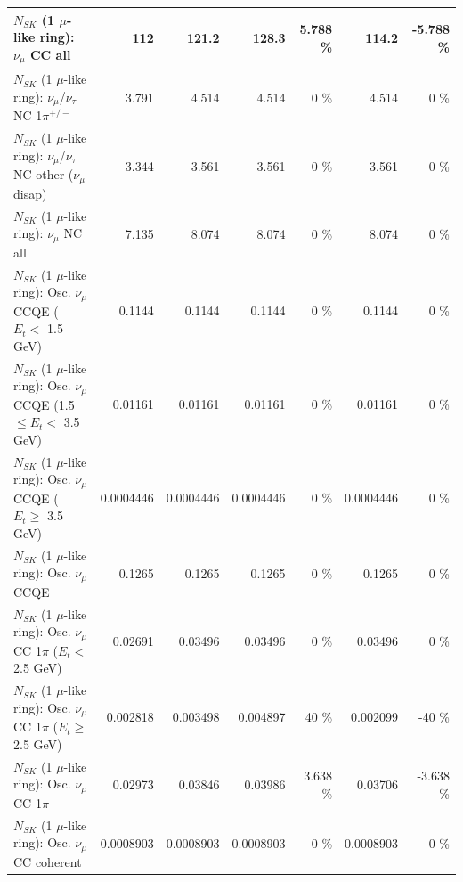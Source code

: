 \begin{table}
\begin{tabular}{| l | r | r | r  r | r  r |}
                                $N_{SK}$ (1 $\mu$-like ring): $\nu_{\mu}$ CC all &             112 &           121.2 &           128.3 &    5.788 \%  &           114.2 &   -5.788 \%  \\ 
\hline
              $N_{SK}$ (1 $\mu$-like ring): $\nu_\mu$/$\nu_\tau$ NC 1$\pi^{+/-}$ &           3.791 &           4.514 &           4.514 &        0 \%  &           4.514 &        0 \%  \\ 
   $N_{SK}$ (1 $\mu$-like ring): $\nu_\mu$/$\nu_\tau$ NC other ($\nu_\mu$ disap) &           3.344 &           3.561 &           3.561 &        0 \%  &           3.561 &        0 \%  \\ 
                                $N_{SK}$ (1 $\mu$-like ring): $\nu_{\mu}$ NC all &           7.135 &           8.074 &           8.074 &        0 \%  &           8.074 &        0 \%  \\ 
\hline
\hline
           $N_{SK}$ (1 $\mu$-like ring): Osc. $\nu_\mu$ CCQE ($E_{t} <$ 1.5 GeV) &          0.1144 &          0.1144 &          0.1144 &        0 \%  &          0.1144 &        0 \%  \\ 
  $N_{SK}$ (1 $\mu$-like ring): Osc. $\nu_\mu$ CCQE (1.5 $\leq E_{t} <$ 3.5 GeV) &         0.01161 &         0.01161 &         0.01161 &        0 \%  &         0.01161 &        0 \%  \\ 
        $N_{SK}$ (1 $\mu$-like ring): Osc. $\nu_\mu$ CCQE ($E_{t} \geq$ 3.5 GeV) &       0.0004446 &       0.0004446 &       0.0004446 &        0 \%  &       0.0004446 &        0 \%  \\ 
\hline
                               $N_{SK}$ (1 $\mu$-like ring): Osc. $\nu_\mu$ CCQE &          0.1265 &          0.1265 &          0.1265 &        0 \%  &          0.1265 &        0 \%  \\ 
\hline
      $N_{SK}$ (1 $\mu$-like ring): Osc. $\nu_\mu$ CC 1$\pi$ ($E_{t} <$ 2.5 GeV) &         0.02691 &         0.03496 &         0.03496 &        0 \%  &         0.03496 &        0 \%  \\ 
   $N_{SK}$ (1 $\mu$-like ring): Osc. $\nu_\mu$ CC 1$\pi$ ($E_{t} \geq$ 2.5 GeV) &        0.002818 &        0.003498 &        0.004897 &       40 \%  &        0.002099 &      -40 \%  \\ 
\hline
                          $N_{SK}$ (1 $\mu$-like ring): Osc. $\nu_\mu$ CC 1$\pi$ &         0.02973 &         0.03846 &         0.03986 &    3.638 \%  &         0.03706 &   -3.638 \%  \\ 
                        $N_{SK}$ (1 $\mu$-like ring): Osc. $\nu_\mu$ CC coherent &       0.0008903 &       0.0008903 &       0.0008903 &        0 \%  &       0.0008903 &        0 \%  \\ 

\end{tabular}
\end{table}

